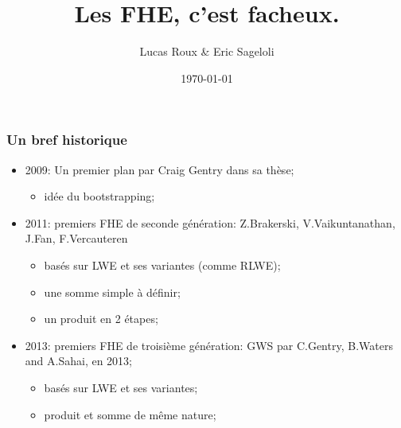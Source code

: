 \documentclass[10pt,xcolor={usenames,dvipsnames}]{beamer}
\title{Les FHE, c'est facheux.}
\date{\today}
\author{Lucas Roux \& Eric Sageloli}
\begin{document}
 \begin{frame} 
 \maketitle
 \end{frame}



 \begin{frame} 
 \frametitle{Un bref historique}

\begin{itemize}
\item 2009: Un premier plan par Craig Gentry dans sa thèse;
\begin{itemize}
\item idée du bootstrapping;
\end{itemize}
\item 2011: premiers FHE de seconde génération: Z.Brakerski, V.Vaikuntanathan, J.Fan, F.Vercauteren \\
	\begin{itemize}
	\item basés sur LWE et ses variantes (comme RLWE);
	\item une somme simple à définir;
	\item un produit en 2 étapes;\\
	\end{itemize}
\item 2013: premiers FHE de troisième génération: GWS par C.Gentry, B.Waters and A.Sahai, en 2013;
	\begin{itemize}
	\item basés sur LWE et ses variantes;
	\item produit et somme de même nature;
	\end{itemize}
\end{itemize}
\end{frame} 

\end{document}

